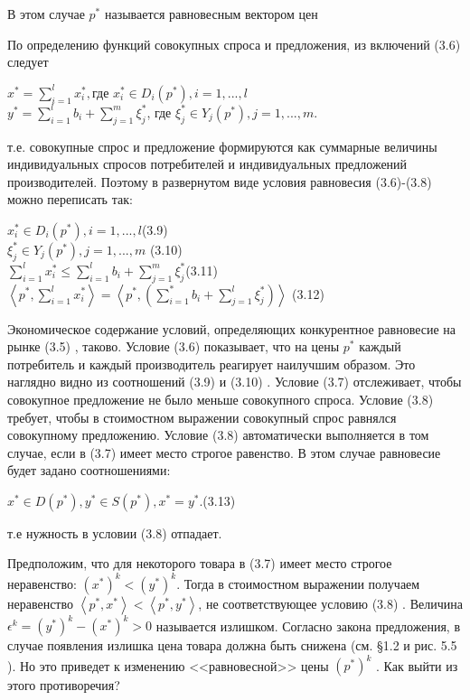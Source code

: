 \documentclass[12pt, 4paper]{book}
\begin{document}
{В этом случае $p^{*}$ называется равновесным вектором цен
\par

По определению функций совокупных спроса и предложения, из включений (3.6) следует
\begin{center}
$x^{*}=\sum\limits_{i=1}^{l}x_{i}^{*},$где $x_{i}^{*} \in D_i(p^{*}),i=1,...,l$ \\
$y^{*}=\sum\limits_{i=1}^{l}b_i + \sum\limits_{j=1}^{m}\xi_{j}^{*}$, где $\xi_{j}^{*} \in Y_j(p^{*}),j=1,...,m.$
\end{center}
\par

т.е. совокупные спрос и предложение формируются как суммарные величины индивидуальных спросов потребителей и индивидуальных предложений производителей. Поэтому в развернутом виде условия равновесия (3.6)-(3.8) можно переписать так:
\begin{center}
$x_{i}^{*} \in D_{i}(p^{*}), i=1,...,l$(3.9)\\
$\xi_{j}^{*} \in Y_j(p^{*}), j=1,...,m$ (3.10)\\
$\sum\limits_{i=1}^{l}x_{i}^{*}\leq \sum\limits_{i=1}^{l}b_i + \sum\limits_{j=1}^{m}\xi_{j}^{*}$(3.11)\\
$\left\langle p^{*},\sum\limits_{i=1}^{l}x_{i}^{*} \right\rangle = \left\langle p^{*},(\sum\limits_{i=1}^{*}b_i + \sum\limits_{j=1}^{l}\xi_{j}^{*})\right\rangle$ (3.12)
\end{center}
\par

Экономическое содержание условий, определяющих конкурентное равновесие на рынке (3.5) , таково. Условие (3.6) показывает, что на цены $p^{*}$ каждый потребитель и каждый производитель реагирует наилучшим образом. Это наглядно видно из соотношений (3.9) и (3.10) . Условие (3.7) отслеживает, чтобы совокупное предложение не было меньше совокупного спроса. Условие (3.8) требует, чтобы в стоимостном выражении совокупный спрос равнялся совокупному предложению. Условие (3.8) автоматически выполняется в том случае, если в (3.7) имеет место строгое равенство. В этом случае равновесие будет задано соотношениями:
\begin{center}
$x^{*} \in D(p^{*}),y^{*} \in S(p^{*}),x^{*}=y^{*}.$(3.13)
\end{center}
т.е нужность в условии (3.8) отпадает.
\par

Предположим, что для некоторого товара в (3.7) имеет место строгое неравенство: $(x^{*})^k < (y^{*})^k$. Тогда в стоимостном выражении получаем неравенство $\left\langle p^{*},x^{*}\right\rangle < \left\langle p^{*},y^{*}\right\rangle$, не соответствующее условию (3.8) . Величина $\epsilon^k = (y^{*})^{k} - (x^{*})^{k}>0$ называется излишком. Согласно закона предложения, в случае появления излишка цена товара должна быть снижена (см. §1.2 и  рис. 5.5 ). Но это приведет к изменению <<равновесной>> цены $(p^{*})^k$ . Как выйти из этого противоречия?
\par

}
\end{document}
